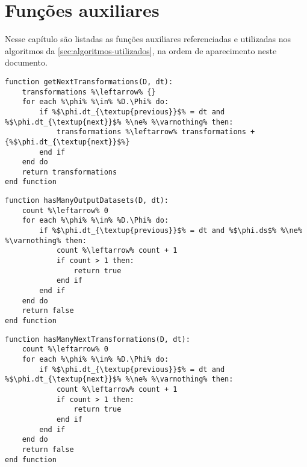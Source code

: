 
\chapter{Funções auxiliares}%
\label{app:funcoes-auxiliares}

Nesse capítulo são listadas as funções auxiliares referenciadas e utilizadas nos algoritmos da \autoref{sec:algoritmos-utilizados}, na ordem de aparecimento neste documento.

\begin{lstlisting}[language=pseudocode,label={lst:get-next-transformations},caption={[Obtenção das próximas transformações de dados de uma transformação]Obtenção das próximas transformações de dados de uma transformação de dados.}]
function getNextTransformations(D, dt):
    transformations %\leftarrow% {}
    for each %\phi% %\in% %D.\Phi% do:
        if %$\phi.dt_{\textup{previous}}$% = dt and %$\phi.dt_{\textup{next}}$% %\ne% %\varnothing% then:
            transformations %\leftarrow% transformations + {%$\phi.dt_{\textup{next}}$%}
        end if
    end do
    return transformations
end function
\end{lstlisting}
 \begin{lstlisting}[language=pseudocode,label={lst:has-many-output-datasets},caption={[Contagem dos conjuntos de dados de saída de uma transformação]Contagem dos conjuntos de dados de saída de uma transformação de dados. Retorna verdadeiro caso essa quantidade seja maior do que um, e falso caso contrário.}]
function hasManyOutputDatasets(D, dt):
    count %\leftarrow% 0
    for each %\phi% %\in% %D.\Phi% do:
        if %$\phi.dt_{\textup{previous}}$% = dt and %$\phi.ds$% %\ne% %\varnothing% then:
            count %\leftarrow% count + 1
            if count > 1 then:
                return true
            end if
        end if
    end do
    return false
end function
\end{lstlisting}
 \begin{lstlisting}[language=pseudocode,label={lst:has-many-next-transformations},caption={[Contagem das próximas transformações de dados de uma transformação]Contagem das próximas transformações de dados de uma transformação de dados. Retorna verdadeiro caso essa quantidade seja maior do que um, e falso caso contrário.}]
function hasManyNextTransformations(D, dt):
    count %\leftarrow% 0
    for each %\phi% %\in% %D.\Phi% do:
        if %$\phi.dt_{\textup{previous}}$% = dt and %$\phi.dt_{\textup{next}}$% %\ne% %\varnothing% then:
            count %\leftarrow% count + 1
            if count > 1 then:
                return true
            end if
        end if
    end do
    return false
end function
\end{lstlisting}
